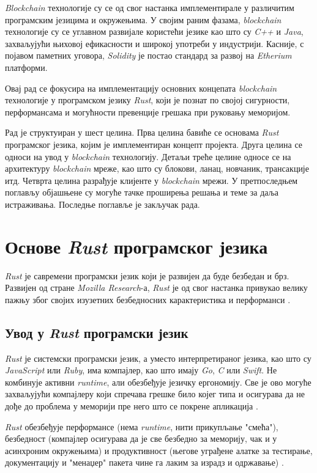 \documentclass[12pt, a4paper]{article}
\begin{document}
\textit{Blockchain} технологије су се од свог настанка имплементирале у различитим програмским језицима и окружењима. У својим раним фазама, \textit{blockchain} технологије су се углавном развијале користећи језике као што су \textit{C++} и \textit{Java}, захваљујући њиховој ефикасности и широкој употреби у индустрији. Касније, с појавом паметних уговора, \textit{Solidity} је постао стандард за развој на \textit{Etherium} платформи.

Овај рад се фокусира на имплементацију основних концепата \textit{blockchain} технологије у програмском језику \textit{Rust}, који је познат по својој сигурности, перформансама и могућности превенције грешака при руковању меморијом.

Рад је структуиран у шест целина. Прва целина бавиће се основама \textit{Rust} програмског језика, којим је имплементиран концепт пројекта. Друга целина се односи на увод у \textit{blockchain} технологију. Детаљи треће целине односе се на архитектуру \textit{blockchain} мреже, као што су блокови, ланац, новчаник, трансакције итд. Четврта целина разрађује клијенте у \textit{blockchain} мрежи. У претпоследњем поглављу објашњене су могуће тачке проширења решања и теме за даља истраживања. Последње поглавље је закључак рада.
\pagebreak

\section{Основе \textit{Rust} програмског језика}
\textit{Rust} је савремени програмски језик који је развијен да буде безбедан и брз. Развијен од стране \textit{Mozilla Research}-а, \textit{Rust} је од свог настанка привукао велику пажњу због својих изузетних безбедносних карактеристика и перформанси \cite{5}.

\subsection{Увод у \textit{Rust} програмски језик}
\textit{Rust} је системски програмски језик, а уместо интерпретираног језика, као што су \textit{JavaScript} или \textit{Ruby}, има компајлер, као што имају \textit{Go}, \textit{C} или \textit{Swift}. Не комбинује активни \textit{runtime}, али обезбеђује језичку ергономију. Све је ово могуће захваљујући компајлеру који спречава грешке било којег типа и осигурава да не дође до проблема у меморији пре него што се покрене апликација \cite{6}.

\textit{Rust} обезбеђује перформансе (нема \textit{runtime}, нити прикупљање "смећа"), безбедност (компајлер осигурава да је све безбедно за меморију, чак и у асинхроним окружењима) и продуктивност (његове уграђене алатке за тестирање, документацију и "менаџер" пакета чине га лаким за израдз и одржавање) \cite{6}. 
\end{document}
